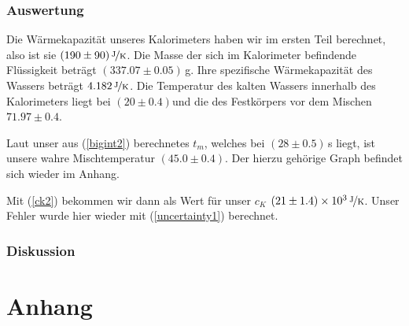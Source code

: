 \documentclass[11pt,a4paper]{article}
\begin{document}
\subsubsection{Auswertung}

Die W\"armekapazit\"at unseres Kalorimeters haben wir im ersten Teil berechnet, also ist sie $(190\pm90)\,\nicefrac{\mathrm{J}}{\mathrm{K}}$. Die Masse der sich im Kalorimeter befindende Fl\"ussigkeit betr\"agt $(337.07\pm0.05)$\,g. Ihre spezifische W\"armekapazit\"at des Wassers betr\"agt $4.182\,\nicefrac{\mathrm{J}}{\mathrm{K}}$. Die Temperatur des kalten Wassers innerhalb des Kalorimeters liegt bei $(20\pm0.4)$\celsius und die des Festk\"orpers vor dem Mischen $71.97\pm0.4$\celsius.

Laut unser aus (\ref{bigint2}) berechnetes $t_m$, welches bei $(28\pm0.5)$\,s liegt, ist unsere wahre Mischtemperatur $(45.0\pm0.4)$\celsius. Der hierzu geh\"orige Graph befindet sich wieder im Anhang.

Mit (\ref{ck2}) bekommen wir dann als Wert f\"ur unser $c_K$ $(21\pm1.4)\times10^3\,\nicefrac{\mathrm{J}}{\mathrm{K}}$. Unser Fehler wurde hier wieder mit (\ref{uncertainty1}) berechnet.

\subsubsection{Diskussion}



\pagebreak

\section{Anhang}
\end{document}
